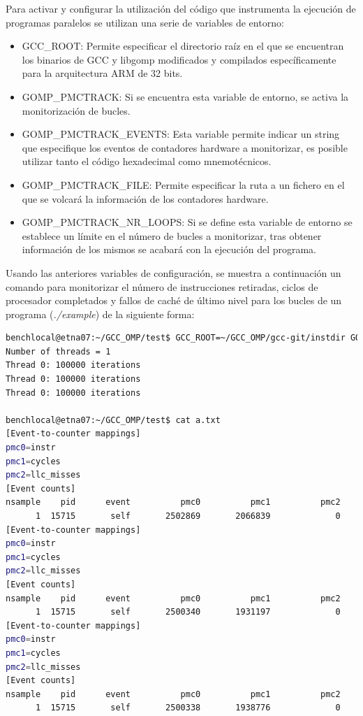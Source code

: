 Para activar y configurar la utilización del código que instrumenta la ejecución de programas paralelos se utilizan una serie de variables de entorno:

\begin{itemize}
  \item GCC\_ROOT: Permite especificar el directorio raíz en el que se encuentran los binarios de GCC y libgomp modificados y compilados específicamente para la arquitectura ARM de 32 bits. 
  \item GOMP\_PMCTRACK: Si se encuentra esta variable de entorno, se activa la monitorización de bucles.
  \item GOMP\_PMCTRACK\_EVENTS: Esta variable permite indicar un string que especifique los eventos de contadores hardware a monitorizar, es posible utilizar tanto el código hexadecimal como mnemotécnicos.
  \item GOMP\_PMCTRACK\_FILE: Permite especificar la ruta a un fichero en el que se volcará la información de los contadores hardware.
  \item GOMP\_PMCTRACK\_NR\_LOOPS: Si se define esta variable de entorno se establece un límite en el número de bucles a monitorizar, tras obtener información de los mismos se acabará con la ejecución del programa.
\end{itemize}

Usando las anteriores variables de configuración, se muestra a continuación un comando para monitorizar el número de instrucciones retiradas, ciclos de procesador completados y fallos de caché de último nivel para los bucles de un programa (\emph{./example}) de la siguiente forma:


\begin{lstlisting}[frame=none,language=bash,basicstyle=\tt\scriptsize]
benchlocal@etna07:~/GCC_OMP/test$ GCC_ROOT=~/GCC_OMP/gcc-git/instdir GOMP_PMCTRACK=1 GOMP_PMCTRACK_EVENTS=instr,cycles,llc_misses GOMP_PMCTRACK_FILE=${PWD}/a.txt GOMP_PMCTRACK_NR_LOOPS  OMP_NUM_THREADS=1 ./example
Number of threads = 1
Thread 0: 100000 iterations
Thread 0: 100000 iterations
Thread 0: 100000 iterations

benchlocal@etna07:~/GCC_OMP/test$ cat a.txt
[Event-to-counter mappings]
pmc0=instr
pmc1=cycles
pmc2=llc_misses
[Event counts]
nsample    pid      event          pmc0          pmc1          pmc2
      1  15715       self       2502869       2066839             0
[Event-to-counter mappings]
pmc0=instr
pmc1=cycles
pmc2=llc_misses
[Event counts]
nsample    pid      event          pmc0          pmc1          pmc2
      1  15715       self       2500340       1931197             0
[Event-to-counter mappings]
pmc0=instr
pmc1=cycles
pmc2=llc_misses
[Event counts]
nsample    pid      event          pmc0          pmc1          pmc2
      1  15715       self       2500338       1938776             0
\end{lstlisting}


